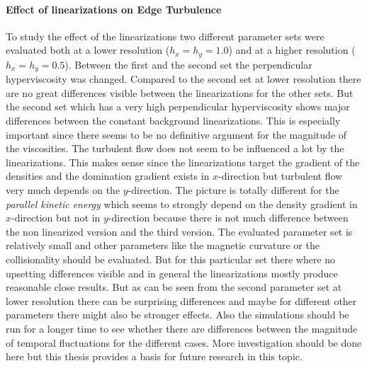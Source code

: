 \documentclass[master.tex]{subfiles}
\begin{document}
\paragraph{Effect of linearizations on Edge Turbulence}
To study the effect of the linearizations two different parameter sets were evaluated both at a lower resolution ($h_x=h_y=1.0$) and at a higher resolution ($h_x=h_y=0.5$). Between the first and the second set the perpendicular hyperviscosity was changed. Compared to the second set at lower resolution there are no great differences visible between the linearizations for the other sets. But the second set which has a very high perpendicular hyperviscosity shows major differences between the constant background linearizations. This is especially important since there seems to be no definitive argument for the magnitude of the viscosities. The turbulent flow does not seem to be influenced a lot by the linearizations. This makes sense since the linearizations target the gradient of the densities and the domination gradient exists in $x$-direction but turbulent flow very much depends on the $y$-direction. The picture is totally different for the \textit{parallel kinetic energy} which seems to strongly depend on the density gradient in $x$-direction but not in $y$-direction because there is not much difference between the non linearized version and the third version.\newline
The evaluated parameter set is relatively small and other parameters like the magnetic curvature or the collisionality should be evaluated. But for this particular set there where no upsetting differences visible and in general the linearizations mostly produce reasonable close results. But as can be seen from the second parameter set at lower resolution there can be surprising differences and maybe for different other parameters there might also be stronger effects. Also the simulations should be run for a longer time to see whether there are differences between the magnitude of temporal fluctuations for the different cases. More investigation should be done here but this thesis provides a basis for future research in this topic. 
\end{document}
